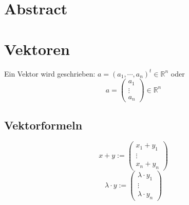 \documentclass[pdftex,12pt,a4paper,fleqn]{scrartcl}
\title{\doctitle}
\subtitle{\docsubtitle}
\author{\docauthor}
\date{\docdate}
\begin{document}
\tableofcontents 

\section{Abstract}
\begin{abstract} 
Dies ist ein CheatSheet for Mathematik für Informatiker im Sommersemester 2016 an der Universität des Saarlands. 

Mitarbeit jeglicher Art ist gerne gesehen. Du hast einen Fehler entdeckt oder ein Thema fehlt? Dann klick hier \url{https://github.com/UdS-Skripte/MFI-II-CheatSheet} und eröffne eine neue \href{https://github.com/UdS-Skripte/MFI-II-CheatSheet/issues/new}{Issue} oder füge dein Thema selber ein mit einem \href{https://github.com/UdS-Skripte/MFI-II-CheatSheet/compare#fork-destination-box}{Pull\ Request}.

\textbf{Bitte hilf mit, dieses Dokument besser zu machen!}
 
\end{abstract}

\newpage

\section{Vektoren}

Ein Vektor wird geschrieben: $a = (a_1, \cdots, a_n)^t \in \mathbb{R}^n$ oder
$$a = \begin{pmatrix}a_{1}\\\vdots\\a_{n}\end{pmatrix} \in \mathbb{R}^n$$

\subsection{Vektorformeln}
$$ x+y := 
\begin{pmatrix}
x_1 + y_1\\
\vdots\\
x_n + y_n
\end{pmatrix}$$
$$\lambda \cdot y := 
\begin{pmatrix}
\lambda \cdot y_1\\
\vdots\\
\lambda \cdot y_n
\end{pmatrix}
$$
\end{document}
